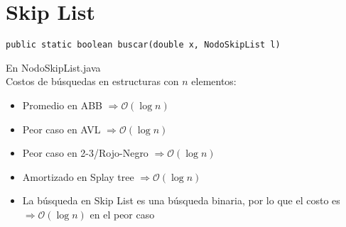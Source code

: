 \documentclass[dcc,sol]{fcfmcourse}
\begin{document}
\section*{Skip List}
\begin{problems}
\problem  \texttt{public static boolean buscar(double x, NodoSkipList l)}
\begin{solution}
En NodoSkipList.java\\
Costos de búsquedas en estructuras con $n$ elementos:
\begin{itemize}
    \item Promedio en ABB $\Rightarrow \mathcal{O}(\log n)$
    \item Peor caso en AVL $\Rightarrow \mathcal{O}(\log n)$
    \item Peor caso en 2-3/Rojo-Negro $\Rightarrow \mathcal{O}(\log n)$
    \item Amortizado en Splay tree $\Rightarrow \mathcal{O}(\log n)$
    \item La búsqueda en Skip List es una búsqueda binaria, por lo que el costo es $\Rightarrow \mathcal{O}(\log n)$ en el peor caso
\end{itemize}
\end{solution}
\end{problems}
\end{document}
